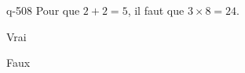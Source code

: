 \begin{truefalse}{q-508}
Pour que $2+2=5$, il faut que $3\times 8 = 24$.
\item* Vrai
\item Faux
\end{truefalse}

